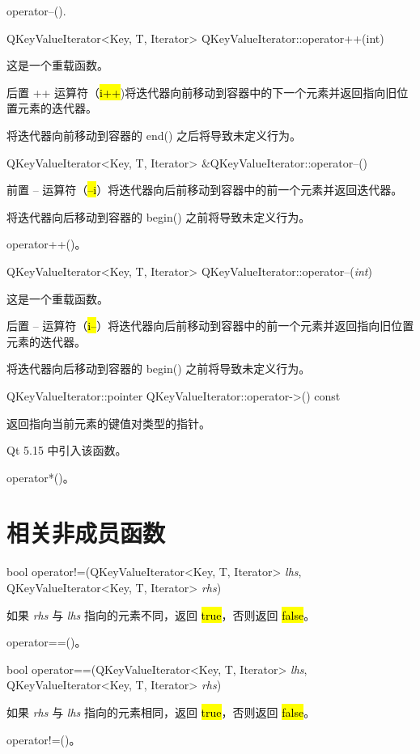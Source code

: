 \begin{notice}[另请参阅]
operator--().
\end{notice}

QKeyValueIterator<Key, T, Iterator> QKeyValueIterator::operator++(int)

这是一个重载函数。

后置 ++ 运算符（\hl{i++})将迭代器向前移动到容器中的下一个元素并返回指向旧位置元素的迭代器。

\begin{notice}
将迭代器向前移动到容器的 end() 之后将导致未定义行为。
\end{notice}

QKeyValueIterator<Key, T, Iterator> \&QKeyValueIterator::operator--()

前置 -- 运算符（\hl{--i}）将迭代器向后前移动到容器中的前一个元素并返回迭代器。

\begin{notice}
将迭代器向后移动到容器的 begin() 之前将导致未定义行为。
\end{notice}

\begin{notice}[另请参阅]
operator++()。
\end{notice}

QKeyValueIterator<Key, T, Iterator> QKeyValueIterator::operator--(\emph{int})

这是一个重载函数。

后置 -- 运算符（\hl{i--}）将迭代器向后前移动到容器中的前一个元素并返回指向旧位置元素的迭代器。

\begin{notice}
将迭代器向后移动到容器的 begin() 之前将导致未定义行为。
\end{notice}

QKeyValueIterator::pointer QKeyValueIterator::operator->() const

返回指向当前元素的键值对类型的指针。

Qt 5.15 中引入该函数。

\begin{notice}[另请参阅]
operator*()。
\end{notice}

\section{相关非成员函数}

bool operator!=(QKeyValueIterator<Key, T, Iterator> \emph{lhs}, QKeyValueIterator<Key, T, Iterator> \emph{rhs})

如果 \emph{rhs} 与 \emph{lhs} 指向的元素不同，返回 \hl{true}，否则返回 \hl{false}。

\begin{notice}[另请参阅]
operator==()。
\end{notice}

bool operator==(QKeyValueIterator<Key, T, Iterator> \emph{lhs}, QKeyValueIterator<Key, T, Iterator> \emph{rhs})

如果 \emph{rhs} 与 \emph{lhs} 指向的元素相同，返回 \hl{true}，否则返回 \hl{false}。

\begin{notice}[另请参阅]
operator!=()。
\end{notice}